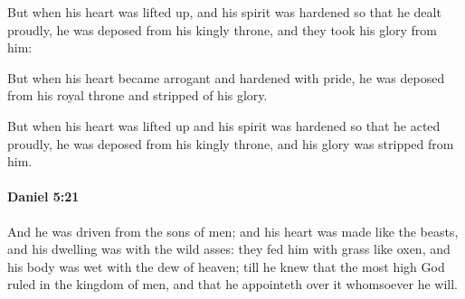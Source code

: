 			\begin{versebox}
					\item[BHS] 
					\item[ASV] But when his heart was lifted up, and his spirit was hardened so that he dealt proudly, he was deposed from his kingly throne, and they took his glory from him:
					\item[NIV] But when his heart became arrogant and hardened with pride, he was deposed from his royal throne and stripped of his glory.
					\item[NRSV] But when his heart was lifted up and his spirit was hardened so that he acted proudly, he was deposed from his kingly throne, and his glory was stripped from him.
			\end{versebox}

		\paragraph{Daniel 5:21} %
			\label{DANIEL-5-21}

			And he was driven from the sons of men; and his heart was made like the beasts, and his dwelling was with the wild asses: they fed him with grass like oxen, and his body was wet with the dew of heaven; till he knew that the most high God ruled in the kingdom of men, and that he appointeth over it whomsoever he will.

